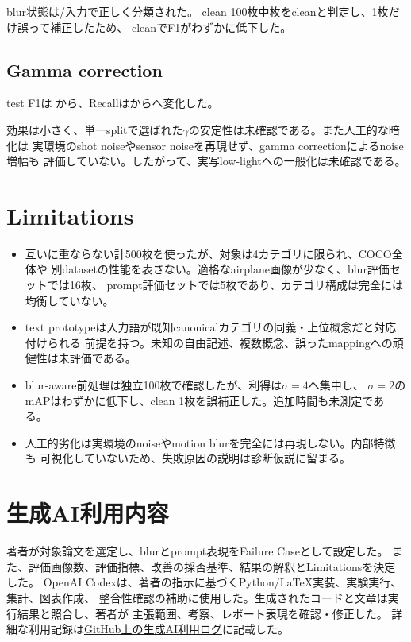 \documentclass[lualatex,ja=standard,a4paper,10pt]{bxjsarticle}
\begin{document}
blur状態は\SameModelDetectorCorrect/\SameModelDetectorTotal 入力で正しく分類された。
clean 100枚中\SameModelCleanCorrect 枚をcleanと判定し、1枚だけ誤って補正したため、
cleanでF1がわずかに低下した。

\subsection{Gamma correction}

test F1は
\LowlightFOne から\GammaFOne、Recallは\LowlightRecall から\GammaRecall へ変化した。

効果は小さく、単一splitで選ばれた$\gamma$の安定性は未確認である。また人工的な暗化は
実環境のshot noiseやsensor noiseを再現せず、gamma correctionによるnoise増幅も
評価していない。したがって、実写low-lightへの一般化は未確認である。

\section{Limitations}

\begin{itemize}
  \item 互いに重ならない計500枚を使ったが、対象は4カテゴリに限られ、COCO全体や
  別datasetの性能を表さない。適格なairplane画像が少なく、blur評価セットでは16枚、
  prompt評価セットでは5枚であり、カテゴリ構成は完全には均衡していない。
  \item text prototypeは入力語が既知canonicalカテゴリの同義・上位概念だと対応付けられる
  前提を持つ。未知の自由記述、複数概念、誤ったmappingへの頑健性は未評価である。
  \item blur-aware前処理は独立100枚で確認したが、利得は$\sigma=4$へ集中し、
  $\sigma=2$のmAPはわずかに低下し、clean 1枚を誤補正した。追加時間も未測定である。
  \item 人工的劣化は実環境のnoiseやmotion blurを完全には再現しない。内部特徴も
  可視化していないため、失敗原因の説明は診断仮説に留まる。
\end{itemize}

\section{生成AI利用内容}

著者が対象論文を選定し、blurとprompt表現をFailure Caseとして設定した。
また、評価画像数、評価指標、改善の採否基準、結果の解釈とLimitationsを決定した。
OpenAI Codexは、著者の指示に基づくPython/LaTeX実装、実験実行、集計、図表作成、
整合性確認の補助に使用した。生成されたコードと文章は実行結果と照合し、著者が
主張範囲、考察、レポート表現を確認・修正した。
詳細な利用記録は\href{https://github.com/fumisugi/visual_media/blob/main/doc/AI_USAGE_LOG.md}
{GitHub上の生成AI利用ログ}に記載した。
\end{document}
